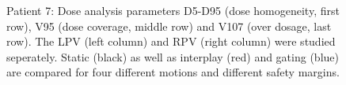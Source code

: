 \documentclass[type=dr, dr=rernat, accentcolor=tud7b,colorbacktitle, bigchapter, openright, twoside, 12pt ]{tudthesis}
\begin{document}
\begin{figure}[H]
{ }
\caption{Patient 7: Dose analysis parameters D5-D95 (dose homogeneity, first row), V95 (dose coverage, middle row) and V107 (over dosage, last row). 
The LPV (left column) and RPV (right column) were studied seperately. Static (black) as well as interplay (red) and gating (blue) 
are compared for four different motions and different safety margins.}
\label{static_interplay_gating_Pat07}
\end{figure}

\newpage
\end{document}
